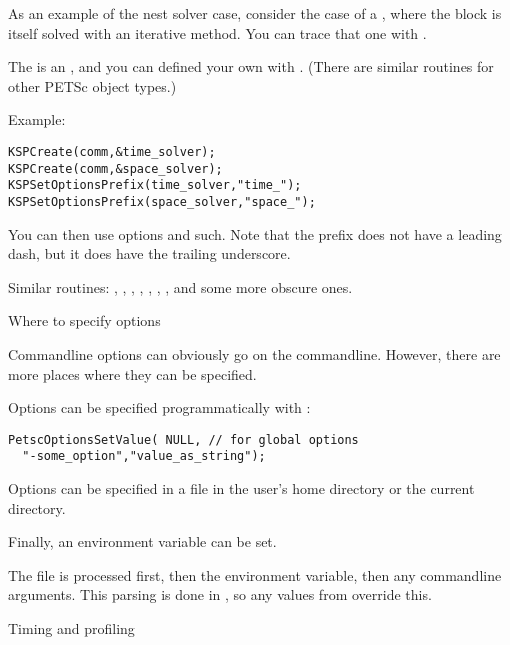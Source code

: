 As an example of the nest solver case, consider the case of a
, where the block is itself solved
with an iterative method. You can trace that one with
.

The  is an , and you can defined
your own with 
.
(There are similar routines for other PETSc object types.)

Example:
\begin{lstlisting}
KSPCreate(comm,&time_solver);
KSPCreate(comm,&space_solver);
KSPSetOptionsPrefix(time_solver,"time_");
KSPSetOptionsPrefix(space_solver,"space_");
\end{lstlisting}
You can then use options  and such.
Note that the prefix does not have a leading dash,
but it does have the trailing underscore.

\begin{raggedlist}
Similar routines:
  , 
  , 
  , 
  , 
  , 
  , 
  , 
and some more obscure ones.
\end{raggedlist}


 {Where to specify options}
\label{sec:petscrc}

Commandline options can obviously go on the commandline. However, there are more
places where they can be specified.

Options can be specified programmatically with
:
\begin{lstlisting}
PetscOptionsSetValue( NULL, // for global options
  "-some_option","value_as_string");
\end{lstlisting}

Options can be specified in a file  in the user's home directory
or the current directory.

Finally, an environment variable  can be set.

The  file is processed first, then the environment variable,
then any commandline arguments. This parsing is done in ,
so any values from  override this.

 {Timing and profiling}
\label{sec:petsc-timing}

